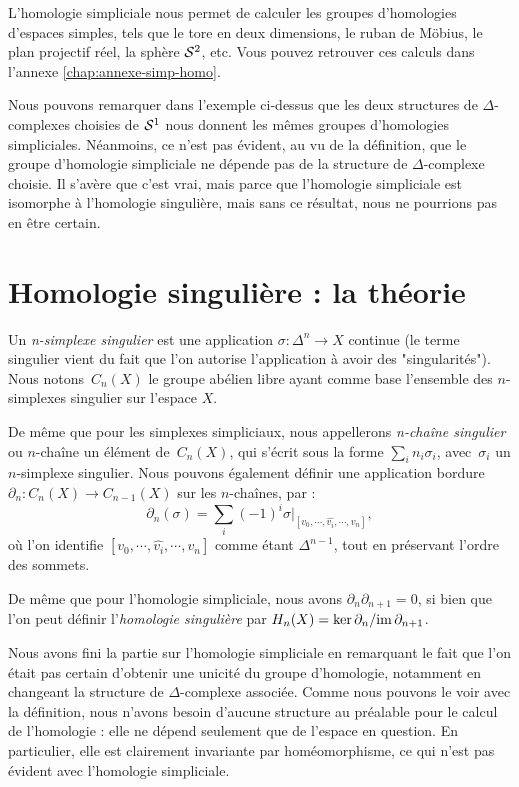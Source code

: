 L'homologie simpliciale nous permet de calculer les groupes d'homologies d'espaces simples, tels que le tore en deux dimensions, le ruban de Möbius, le plan projectif réel, la sphère $\mathcal{S}^{2}$, etc. Vous pouvez retrouver ces calculs dans l'annexe \ref{chap:annexe-simp-homo}.

\begin{remark}
Nous pouvons remarquer dans l'exemple ci-dessus que les deux structures de $\Delta$-complexes choisies de $\mathcal{S}^{1}$ nous donnent les mêmes groupes d'homologies simpliciales. Néanmoins, ce n'est pas évident, au vu de la définition, que le groupe d'homologie simpliciale ne dépende pas de la structure de $\Delta$-complexe choisie. Il s'avère que c'est vrai, mais parce que l'homologie simpliciale est isomorphe à l'homologie singulière, mais sans ce résultat, nous ne pourrions pas en être certain.
\end{remark}

\section{Homologie singulière : la théorie}

\begin{definition}\label{def:homology-sing}
Un \emph{n-simplexe singulier} est une application $\sigma:\Delta^n\to X$ continue (le terme singulier vient du fait que l'on autorise l'application à avoir des "singularités"). Nous notons~$C_n(X)$ le groupe abélien libre ayant comme base l'ensemble des $n$-simplexes singulier sur l'espace $X$. 

De même que pour les simplexes simpliciaux, nous appellerons \emph{n-chaîne singulier} ou $n$-chaîne un élément de~$C_n(X)$, qui s'écrit sous la forme $\sum_in_i\sigma_i$, avec~$\sigma_i$ un $n$-simplexe singulier. Nous pouvons également définir une application bordure $\partial_n:C_n(X)\to C_{n-1}(X)$ sur les $n$-chaînes, par : \[\partial_n(\sigma)=\sum_i(-1)^i\sigma|_{[v_0,\cdots,\hat{v_i},\cdots,v_n]},\] où l'on identifie  $[v_0,\cdots,\hat{v_i},\cdots,v_n]$ comme étant $\Delta^{n-1}$, tout en préservant l'ordre des sommets.

De même que pour l'homologie simpliciale, nous avons $\partial_n\partial_{n+1}=0$, si bien que l'on peut définir l'\emph{homologie singulière} par $H_n(X)=\ker\partial_n/\mathrm{im}\,\partial_{n+1}$.
\end{definition}

Nous avons fini la partie sur l'homologie simpliciale en remarquant le fait que l'on était pas certain d'obtenir une unicité du groupe d'homologie, notamment en changeant la structure de $\Delta$-complexe associée. Comme nous pouvons le voir avec la définition, nous n'avons besoin d'aucune structure au préalable pour le calcul de l'homologie : elle ne dépend seulement que de l'espace en question. En particulier, elle est clairement invariante par homéomorphisme, ce qui n'est pas évident avec l'homologie simpliciale.

